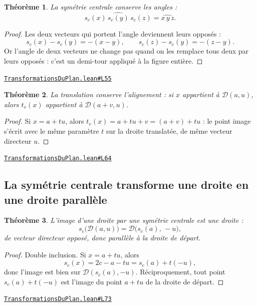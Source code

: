 \documentclass[11pt,a4paper]{article}
\theoremstyle{definition}
\theoremstyle{plain}
\newtheorem{theoreme}{Théorème}
\newcommand{\source}[2]{\par\smallskip\noindent\hfill{\footnotesize\href{#1}{\texttt{#2}}}\par\smallskip}
\begin{document}
\begin{theoreme}
La symétrie centrale conserve les angles :
\[ \widehat{s_c(x)\,s_c(y)\,s_c(z)} = \widehat{x\,y\,z} . \]
\end{theoreme}

\begin{proof}
Les deux vecteurs qui portent l'angle deviennent leurs opposés :
\[ s_c(x) - s_c(y) = -(x - y), \qquad s_c(z) - s_c(y) = -(z - y) . \]
Or l'angle de deux vecteurs ne change pas quand on les remplace tous deux par leurs
opposés : c'est un demi-tour appliqué à la figure entière.
\end{proof}
\source{https://github.com/Commutator-IO/learn-lean/blob/main/cours/01-college/03-transformations-du-plan/TransformationsDuPlan.lean\#L55}{TransformationsDuPlan.lean\#L55}

\begin{theoreme}
La translation conserve l'alignement : si $x$ appartient à $\mathcal{D}(a, u)$,
alors $t_v(x)$ appartient à $\mathcal{D}(a + v, u)$.
\end{theoreme}

\begin{proof}
Si $x = a + tu$, alors $t_v(x) = a + tu + v = (a + v) + tu$ : le point image s'écrit
avec le même paramètre $t$ sur la droite translatée, de même vecteur directeur $u$.
\end{proof}
\source{https://github.com/Commutator-IO/learn-lean/blob/main/cours/01-college/03-transformations-du-plan/TransformationsDuPlan.lean\#L64}{TransformationsDuPlan.lean\#L64}

\subsection{La symétrie centrale transforme une droite en une droite parallèle}

\begin{theoreme}
L'image d'une droite par une symétrie centrale est une droite :
\[ s_c\bigl(\mathcal{D}(a, u)\bigr) = \mathcal{D}\bigl(s_c(a),\, -u\bigr) , \]
de vecteur directeur opposé, donc parallèle à la droite de départ.
\end{theoreme}

\begin{proof}
Double inclusion. Si $x = a + tu$, alors
\[ s_c(x) = 2c - a - tu = s_c(a) + t(-u) , \]
donc l'image est bien sur $\mathcal{D}(s_c(a), -u)$. Réciproquement, tout point
$s_c(a) + t(-u)$ est l'image du point $a + tu$ de la droite de départ.
\end{proof}
\source{https://github.com/Commutator-IO/learn-lean/blob/main/cours/01-college/03-transformations-du-plan/TransformationsDuPlan.lean\#L73}{TransformationsDuPlan.lean\#L73}
\end{document}
